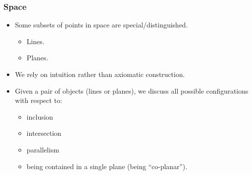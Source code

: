 \begin{frame}
\frametitle{Space}
\begin{itemize}
\item<1-> Some subsets of points in space are special/distinguished.
\begin{itemize}
\item<2-> Lines.
\item<3-> Planes.
\end{itemize}
\item<4-> We rely on intuition rather than axiomatic construction.
\item<5-> Given a pair of objects (lines or planes), we discuss all possible configurations with respect to: 
\begin{itemize}
\item<6-> inclusion
\item<7-> intersection
\item<8-> parallelism
\item<9-> being contained in a single plane (being ``co-planar'').
\end{itemize}
\end{itemize}
\end{frame}

